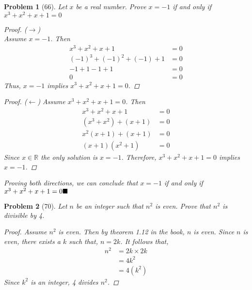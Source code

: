 \documentclass{article}
\theoremstyle{problem}
\newtheorem{prob}{Problem}
\renewcommand{\qedsymbol}{$\blacksquare$}
\def\bs{\hspace{\stretch1}\ensuremath\blacksquare}
\begin{document}
\begin{prob}[66]
  Let $x$ be a real number. Prove $x = -1$ if and only if $x^3 + x^2 + x + 1 = 0$
  \renewcommand\qedsymbol{}
  \begin{proof} ($\rightarrow$)\\
    Assume $x = -1$. Then 
    \begin{align*}
      x^3 + x^2 + x + 1          &= 0\\
      (-1)^3 + (-1)^2 + (-1) + 1 &= 0\\
      -1 + 1 -1 + 1              &= 0\\
      0                          &= 0
    \end{align*}
      Thus, $x = -1$ implies $x^3 + x^2 + x + 1 = 0$.
  \end{proof}

  \begin{proof} ($\leftarrow$)
    Assume $x^3 + x^2 + x + 1 = 0$. Then
    \begin{align*}
      x^3 + x^2 + x + 1     &= 0\\
      (x^3 + x^2) + (x + 1) &= 0\\
      x^2(x+1) + (x+1)      &= 0\\
      (x+1)(x^2 + 1)        &= 0
    \end{align*}
    Since $x \in \mathbb{R}$ the only solution is $x = -1$. Therefore, $x^3 + x^2 + x + 1 = 0$ implies $x = -1$.
  \end{proof}
Proving both directions, we can conclude that $x = -1$ if and only if $x^3 + x^2 + x + 1 = 0 \bs$
\end{prob}
\renewcommand{\qedsymbol}{$\blacksquare$}

 \begin{prob}[70]
   Let $n$ be an integer such that $n^2$ is even. Prove that $n^2$ is divisible by 4.
   \begin{proof}
     Assume $n^2$ is even. Then by theorem 1.12 in the book, $n$ is even. Since $n$ is even, there exists a $k$ such that, $n = 2k$. It follows that,
     \begin{align*}
       n^2 &= 2k \times 2k\\
           &= 4k^2\\
           &= 4(k^2)
     \end{align*}
     Since $k^2$ is an integer, 4 divides $n^2$.
  \end{proof}
\end{prob}
\end{document}
